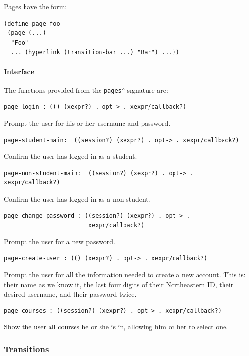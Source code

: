 \documentclass[a4paper]{article}
\begin{document}
Pages have the form:

\begin{verbatim}
(define page-foo 
 (page (...)
  "Foo"
  ... (hyperlink (transition-bar ...) "Bar") ...))
\end{verbatim}

\paragraph{Interface}\label{para:pages-interface}

The functions provided from the \verb|pages^| signature are:

\begin{verbatim}
page-login : (() (xexpr?) . opt-> . xexpr/callback?)
\end{verbatim}
Prompt the user for his or her username and password.

\begin{verbatim}
page-student-main:  ((session?) (xexpr?) . opt-> . xexpr/callback?)
\end{verbatim}
Confirm the user has logged in as a student.

\begin{verbatim}
page-non-student-main:  ((session?) (xexpr?) . opt-> . xexpr/callback?)
\end{verbatim}
Confirm the user has logged in as a non-student.

\begin{verbatim}
page-change-password : ((session?) (xexpr?) . opt-> . 
                        xexpr/callback?)
\end{verbatim}
Prompt the user for a new password.

\begin{verbatim}
page-create-user : (() (xexpr?) . opt-> . xexpr/callback?)
\end{verbatim}
Prompt the user for all the information needed to create a
new account. This is: their name as we know it, the last
four digits of their Northeastern ID, their desired username,
and their password twice.

\begin{verbatim}
page-courses : ((session?) (xexpr?) . opt-> . xexpr/callback?)
\end{verbatim}
Show the user all courses he or she is in, allowing him or her to select one.

\subsubsection{Transitions}\label{subsubsec:transitions}
\end{document}
